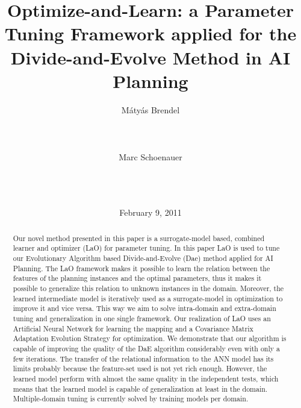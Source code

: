 \documentclass{acm_proc_article-sp}
\begin{document}
\title{Optimize-and-Learn: a Parameter Tuning Framework applied for the Divide-and-Evolve Method in AI Planning}


\author{
\alignauthor
M{\'a}ty{\'a}s Brendel\\
       \\
       \\
       \\
\alignauthor
Marc Schoenauer\\
       \\
       \\
       \\
}

\date{February 9, 2011}
\maketitle
\begin{abstract}
\noindent Our novel method presented in this paper is a surrogate-model based, combined learner and optimizer (LaO) for parameter tuning. In this paper LaO is used to tune our Evolutionary Algorithm based Divide-and-Evolve (Dae) method applied for AI Planning. The LaO framework makes it possible to learn the relation between the features of the planning instances and the optimal parameters, thus it makes it possible to generalize this relation to unknown instances in the domain. Moreover, the learned intermediate model is iteratively used as a surrogate-model in optimization to improve it and vice versa. This way we aim to solve intra-domain and extra-domain tuning and generalization in one single framework. Our realization of LaO uses an Artificial Neural Network for learning the mapping and a Covariance Matrix Adaptation Evolution Strategy for optimization. We demonstrate that our algorithm is capable of improving the quality of the DaE algorithm considerably even with only a few iterations. The transfer of the relational information to the ANN model has its limits probably because the feature-set used is not yet rich enough. However, the learned model perform with almost the same quality in the independent tests, which means that the learned model is capable of generalization at least in the domain. Multiple-domain tuning is currently solved by training models per domain.

\end{abstract}
\end{document}
